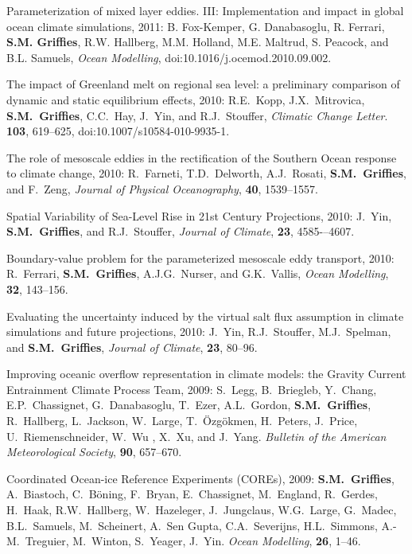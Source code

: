 \begin{etaremune}
\item Parameterization of mixed layer eddies. III: Implementation and
  impact in global ocean climate simulations, 2011: B. Fox-Kemper,
  G. Danabasoglu, R. Ferrari, {\bf S.M. Grif\/f\/ies}, R.W. Hallberg,
  M.M. Holland, M.E. Maltrud, S. Peacock, and B.L. Samuels, {\it Ocean
    Modelling}, doi:10.1016/j.ocemod.2010.09.002.

\item The impact of Greenland melt on regional sea level: a
  preliminary comparison of dynamic and static equilibrium effects,
  2010: R.E.\ Kopp, J.X.\ Mitrovica, {\bf S.M.\ Grif\/f\/ies}, C.C.\
  Hay, J.\ Yin, and R.J.\ Stouffer, {\it Climatic Change Letter}.\,
  {\bf 103}, 619--625, doi:10.1007/s10584-010-9935-1.

\item The role of mesoscale eddies in the rectification of the
  Southern Ocean response to climate change, 2010: R.\ Farneti, T.D.\
  Delworth, A.J.\ Rosati, {\bf S.M.\ Grif\/f\/ies}, and F.\ Zeng, {\em
    Journal of Physical Oceanography}, {\bf 40}, 1539--1557.

\item Spatial Variability of Sea-Level Rise in 21st Century
  Projections, 2010: J.\ Yin, {\bf S.M.\ Grif\/f\/ies}, and R.J.\
  Stouffer, {\it Journal of Climate}, {\bf 23}, 4585-–4607.

\item Boundary-value problem for the parameterized mesoscale eddy
  transport, 2010: R.\ Ferrari, {\bf S.M.\ Grif\/f\/ies}, A.J.G.\
  Nurser, and G.K.\ Vallis, {\em Ocean Modelling}, {\bf 32}, 143--156.

\item Evaluating the uncertainty induced by the virtual salt flux
  assumption in climate simulations and future projections, 2010: J.\
  Yin, R.J.\ Stouffer, M.J.\ Spelman, and {\bf S.M.\ Grif\/f\/ies},
  {\em Journal of Climate}, {\bf 23}, 80--96.

\item Improving oceanic overflow representation in climate models: the
  Gravity Current Entrainment Climate Process Team, 2009: S.\ Legg,
  B.\ Briegleb, Y.\ Chang, E.P.\ Chassignet, G.\ Danabasoglu, T.\
  Ezer, A.L.\ Gordon, {\bf S.M.\ Grif\/f\/ies}, R.\ Hallberg, L.\
  Jackson, W.\ Large, T.\ \"Ozg\"okmen, H.\ Peters, J.\ Price, U.\
  Riemenschneider, W.\ Wu , X.\ Xu, and J.\ Yang.  {\em Bulletin of
    the American Meteorological Society}, {\bf 90}, 657--670.

\item Coordinated Ocean-ice Reference Experiments (COREs), 2009: {\bf
    S.M.\ Grif\/f\/ies}, A.\ Biastoch, C.\ B\"{o}ning, F.\ Bryan, E.\
  Chassignet, M.\ England, R.\ Gerdes, H.\ Haak, R.W.\ Hallberg, W.\
  Hazeleger, J.\ Jungclaus, W.G.\ Large, G.\ Madec, B.L.\ Samuels, M.\
  Scheinert, A.\ Sen Gupta, C.A.\ Severijns, H.L.\ Simmons, A.-M.\
  Treguier, M.\ Winton, S.\ Yeager, J.\ Yin.  {\em Ocean Modelling},
  {\bf 26}, 1--46.  


\end{etaremune}
